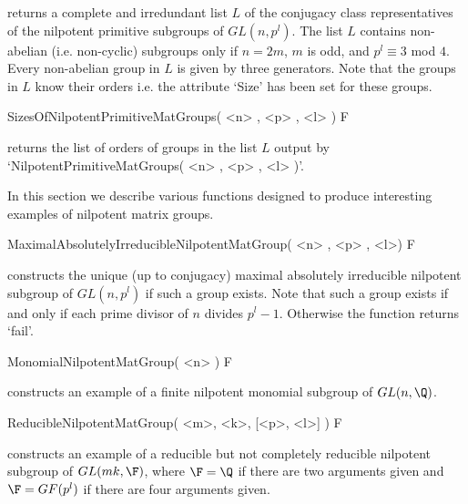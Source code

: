returns a complete and irredundant list $L$ of the conjugacy class
representatives of the nilpotent primitive subgroups of $GL(n,p^l)$.
The list $L$ contains non-abelian (i.e. non-cyclic) subgroups only
if $n=2m$, $m$ is odd, and $p^l \equiv 3$ mod $4$. Every non-abelian
group in $L$ is given by three generators. Note that the groups in
$L$ know their orders i.e. the attribute `Size' has been set for these
groups.

\> SizesOfNilpotentPrimitiveMatGroups( <n> , <p> , <l> ) F

returns the list of orders of groups in the list $L$ output by
`NilpotentPrimitiveMatGroups( <n> , <p> , <l> )'.


In this section we describe various functions designed to produce
interesting examples of nilpotent matrix groups.

\>  MaximalAbsolutelyIrreducibleNilpotentMatGroup( <n> , <p> , <l>) F

constructs the unique (up to conjugacy) maximal absolutely
irreducible nilpotent subgroup of $GL(n,p^l)$ if such a group
exists. Note that such a group exists if and only if each prime
divisor of $n$ divides $p^l-1$. Otherwise the function returns
`fail'.

\> MonomialNilpotentMatGroup( <n> ) F

constructs an example of a finite nilpotent monomial subgroup of $GL(n,\Q)$.

\> ReducibleNilpotentMatGroup( <m>, <k>, [<p>, <l>] ) F

constructs an example of a reducible but not completely reducible
nilpotent subgroup of $GL(mk, \F)$, where $\F = \Q$ if there are
two arguments given and $\F = GF(p^l)$ if there are four arguments
given.
